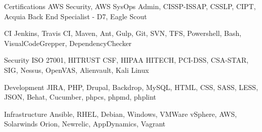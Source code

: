 


\begin{cvskills}


\cvskill
{Certifications}
{AWS Security, AWS SysOps Admin, CISSP-ISSAP, CSSLP, CIPT, Acquia Back End Specialist - D7, Eagle Scout }

\cvskill
{CI}
{Jenkins, Travis CI, Maven, Ant, Gulp, Git, SVN, TFS, Powershell, Bash, VisualCodeGrepper, DependencyChecker }

\cvskill
{Security}
{ISO 27001, HITRUST CSF, HIPAA HITECH, PCI-DSS, CSA-STAR, SIG, Nessus, OpenVAS, Alienvault, Kali Linux }

\cvskill
{Development}
{JIRA, PHP, Drupal, Backdrop, MySQL, HTML, CSS, SASS, LESS, JSON, Behat, Cucumber, phpcs, phpmd, phplint }

\cvskill
{Infrastructure}
{Ansible, RHEL, Debian, Windows, VMWare vSphere, AWS, Solarwinds Orion, Newrelic, AppDynamics, Vagrant }




\end{cvskills}
